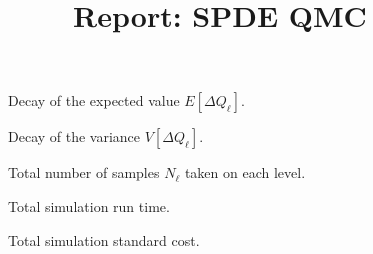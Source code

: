 \documentclass[11pt, oneside]{article}
\title{Report: SPDE QMC}
\date{}
\newlength\figureheight
\newlength\figurewidth
\begin{document}
\maketitle

\begin{figure}[h]
\centering
\setlength{\figureheight}{0.3\textwidth}
\setlength{\figurewidth}{0.3\textwidth}

 \caption{\label{fig:E}Decay of the expected value $E[\Delta Q_\ell]$.}
\end{figure}


\begin{figure}[h]
\centering
\setlength{\figureheight}{0.3\textwidth}
\setlength{\figurewidth}{0.3\textwidth}

 \caption{\label{fig:V}Decay of the variance $V[\Delta Q_\ell]$.}
\end{figure}


\begin{figure}[h]
\centering
\setlength{\figureheight}{0.3\textwidth}
\setlength{\figurewidth}{0.3\textwidth}

 \caption{\label{fig:samples}Total number of samples $N_\ell$ taken on each level.}
\end{figure}


\begin{figure}[h]
\centering
\setlength{\figureheight}{0.3\textwidth}
\setlength{\figurewidth}{0.3\textwidth}

 \caption{\label{fig:time}Total simulation run time.}
\end{figure}


\begin{figure}[h]
\centering
\setlength{\figureheight}{0.3\textwidth}
\setlength{\figurewidth}{0.3\textwidth}

 \caption{\label{fig:cost}Total simulation standard cost.}
\end{figure}
\end{document}
